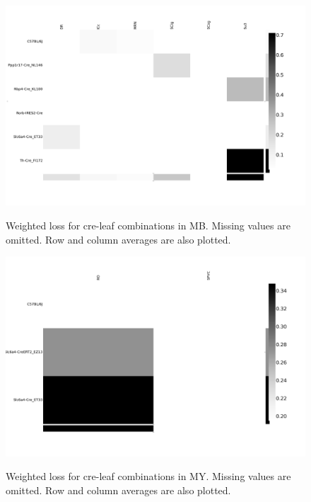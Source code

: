 \begin{figure}[H]
    \centering
    \includegraphics[width = 7in]{figs/lossdetails_313.png} 
    \label{fig:distances}
    \caption{Weighted loss for cre-leaf combinations in MB. Missing values are omitted.   Row and column averages are also plotted.}
\end{figure}

\begin{figure}[H]
    \centering
    \includegraphics[width = 7in]{figs/lossdetails_354.png} 
    \label{fig:distances}
    \caption{Weighted loss for cre-leaf combinations in MY. Missing values are omitted.   Row and column averages are also plotted.}
\end{figure}

